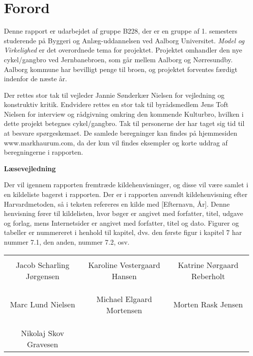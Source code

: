 \chapter*{Forord}
Denne rapport er udarbejdet af gruppe B228, der er en gruppe af 1. semesters studerende på Byggeri og Anlæg-uddannelsen ved Aalborg Universitet. \textit{Model og Virkelighed} er det overordnede tema for projektet.
Projektet omhandler den nye cykel/gangbro ved Jernbanebroen, som går mellem Aalborg og Nørresundby. Aalborg kommune har bevilligt penge til broen, og projektet forventes færdigt indenfor de næste år.

Der rettes stor tak til vejleder Jannie Sønderkær Nielsen for vejledning og konstruktiv kritik. Endvidere rettes en stor tak til byrådsmedlem Jens Toft Nielsen for interview og rådgivning omkring den kommende Kulturbro, hvilken i dette projekt betegnes cykel/gangbro. Tak til personerne der har taget sig tid til at besvare spørgeskemaet. 
De samlede beregninger kan findes på hjemmesiden www.markhaurum.com, da der kun vil findes eksempler og korte uddrag af beregningerne i rapporten. 

\textbf{Læsevejledning}

Der vil igennem rapporten fremtræde kildehenvisninger, og disse vil være samlet i en kildeliste bagerst i rapporten. Der er i rapporten anvendt kildehenvisning efter Harvardmetoden, så i teksten refereres en kilde med [Efternavn, År]. Denne henvisning fører til kildelisten, hvor bøger er angivet med forfatter, titel, udgave og forlag, mens Internetsider er angivet med forfatter, titel og dato. Figurer og tabeller er nummereret i henhold til kapitel, dvs. den første figur i kapitel 7 har nummer 7.1, den anden, nummer 7.2, osv. 

\phantom{Luft}

\phantom{Luft}

\begin{table}[H]
	\centering
		\begin{tabular}{c c c}
			\underline{\phantom{mmmmmmmmmmmmmm}} & \underline{\phantom{mmmmmmmmmmmmmm}} & \underline{\phantom{mmmmmmmmmmmmmm}} \\
			Jacob Scharling Jørgensen			& Karoline Vestergaard Hansen 		& Katrine Nørgaard Reberholt 			\\
			&&\\
			&&\\
			\underline{\phantom{mmmmmmmmmmmmmm}} & \underline{\phantom{mmmmmmmmmmmmmm}} & \underline{\phantom{mmmmmmmmmmmmmm}} \\
			Marc Lund Nielsen			& Michael Elgaard Mortensen 		& Morten Rask Jensen 				\\
			&&\\
			&&\\
			\underline{\phantom{mmmmmmmmmmmmmm}} \\
			Nikolaj Skov Gravesen						
		\end{tabular}
\end{table}